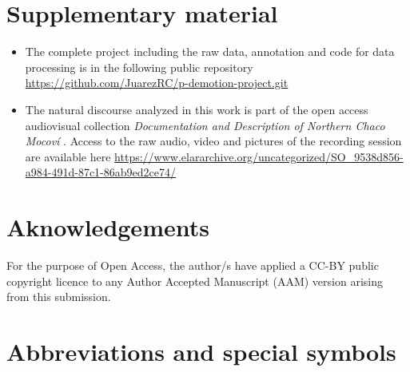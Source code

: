 \documentclass[12pt]{article}
\begin{document}
\section*{Supplementary material}{\label{sec:supplementary}}
\begin{itemize}
\item The complete project including the raw data, annotation and code for data processing is in the following public repository  \url{https://github.com/JuarezRC/p-demotion-project.git}

\item  The natural discourse analyzed in this work is part of the open access audiovisual collection \textit{Documentation and Description of Northern Chaco Mocoví} \citep{Juarez2019}. Access to the raw audio, video and pictures of the recording session are available here \url{https://www.elararchive.org/uncategorized/SO_9538d856-a984-491d-87c1-86ab9ed2ce74/}
\end{itemize} 

\section*{Aknowledgements}
For the purpose of Open Access, the author/s have applied a CC-BY public copyright licence to any Author Accepted Manuscript (AAM) version arising from this submission.

\section*{Abbreviations and special symbols}
\printglosses	



%
\end{document}
